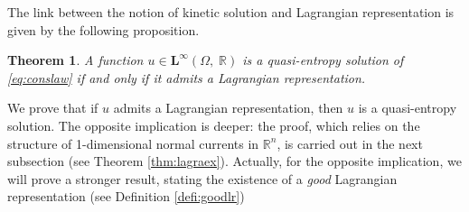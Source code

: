 \documentclass[11pt, twoside, reqno]{amsart}
\newtheorem{thm}{Theorem}[section]
\theoremstyle{definition}
\theoremstyle{remark}
\numberwithin{equation}{section}
\begin{document}
The link between the notion of kinetic solution and Lagrangian representation is given by the following proposition.
\begin{thm}\label{thm:lagrkin}
A function $u \in \mathbf L^\infty(\Omega, \; \mathbb R)$ is a quasi-entropy solution of \eqref{eq:conslaw}  if and only if it admits a Lagrangian representation.
\end{thm}
We prove that if $u$ admits a Lagrangian representation, then $u$ is a quasi-entropy solution. The opposite implication is deeper: the proof, which relies on the structure of 1-dimensional normal currents in $\mathbb R^n$, is carried out in the next subsection (see Theorem \ref{thm:lagraex}). Actually, for the opposite implication, we will prove a stronger result, stating the existence of a \emph{good} Lagrangian representation (see Definition \ref{defi:goodlr})
\end{document}
